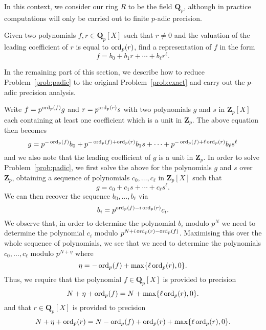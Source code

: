 In this context, we consider our ring $R$ to be the field $\mathbf{Q}_p$, 
although in practice computations will only be carried out to finite 
$p$-adic precision.

\begin{prob} \label{prob:padic}
Given two polynomials $f, r \in \mathbf{Q}_p[X]$ such that 
$r \neq 0$ and the valuation of the leading coefficient of 
$r$ is equal to $\operatorname{ord}_p(r)$, find a representation of $f$ 
in the form
\begin{equation}
f = b_0 + b_1 r + \dotsb + b_{\ell} r^{\ell}.
\end{equation}
\end{prob}

In the remaining part of this section, we describe how to 
reduce Problem~\ref{prob:padic} to the original 
Problem~\ref{prob:exact} and carry out the $p$-adic precision 
analysis.

Write $f = p^{\operatorname{ord}_p(f)} g$ and $r = p^{\operatorname{ord}_p(r)} s$ 
with two polynomials $g$ and $s$ in $\mathbf{Z}_p[X]$ 
each containing at least one coefficient which is a unit 
in $\mathbf{Z}_p$.  The above equation then becomes
\begin{equation}
g = p^{-\operatorname{ord}_p(f)} b_0 + p^{-\operatorname{ord}_p(f) + \operatorname{ord}_p(r)} b_1 s + \dotsb + p^{-\operatorname{ord}_p(f) + \ell \operatorname{ord}_p(r)} b_{\ell} s^{\ell}
\end{equation}
and we also note that the leading coefficient of $g$ 
is a unit in $\mathbf{Z}_p$.
In order to solve Problem~\ref{prob:padic}, we first solve the above 
for the polynomials $g$ and $s$ over $\mathbf{Z}_p$, obtaining a 
sequence of polynomials $c_0, \dotsc, c_{\ell}$ in $\mathbf{Z}_p[X]$ 
such that 
\begin{equation}
g = c_0 + c_1 s + \dotsb + c_{\ell} s^{\ell}.
\end{equation}
We can then recover the sequence $b_0, \dotsc, b_{\ell}$ via 
\begin{equation}
b_i = p^{\operatorname{ord}_p(f) - i \operatorname{ord}_p(r)} c_i.
\end{equation}
We observe that, in order to determine the polynomial $b_i$ 
modulo $p^N$ we need to determine the polynomial $c_i$ 
modulo $p^{N + i \operatorname{ord}_p(r) - \operatorname{ord}_p(f)}$.  Maximising this 
over the whole sequence of polynomials, we see that we need 
to determine the polynomials $c_0, \dotsc, c_{\ell}$ modulo 
$p^{N + \eta}$ where
\begin{equation}
\eta = - \operatorname{ord}_p(f) + \max\{\ell \operatorname{ord}_p(r), 0\}.
\end{equation}
Thus, we require that the polynomial $f \in \mathbf{Q}_p[X]$ 
is provided to precision 
\begin{equation}
N + \eta + \operatorname{ord}_p(f) = N + \max\{\ell \operatorname{ord}_p(r), 0\}.
\end{equation}
and that $r \in \mathbf{Q}_p[X]$ is provided to precision 
\begin{equation}
N + \eta + \operatorname{ord}_p(r) = N - \operatorname{ord}_p(f) + \operatorname{ord}_p(r) + \max\{\ell \operatorname{ord}_p(r), 0\}.
\end{equation}

